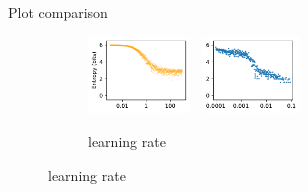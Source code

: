 \documentclass{beamer}
\begin{document}
\begin{frame}{Plot comparison}
    \begin{center}
        \begin{figure}
            \def\plotheight{0.8in}
            \def\subfigwidth{0.30}
            \centering

            \begin{subfigure}[t]{0.36\linewidth}
                \centering
                \includegraphics[height=\plotheight]{assets/model-alpha.pdf}
                \hbox{
                    \hspace{0.1em}
                    \includegraphics[height=\plotheight]{assets/learning_rate_log-entropy-default.pdf}
                }
                \caption{\scriptsize learning rate}
            \end{subfigure}

\end{figure}
\end{center}
\end{frame}
\end{document}

